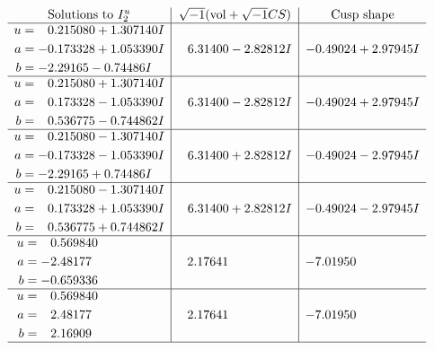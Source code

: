 \documentclass[1p]{elsarticle_modified}
\theoremstyle{definition}
\newcommand{\I}{\sqrt{-1}}
\begin{document}
$$\begin{array}{c|c|c}  
\text{Solutions to }I^u_{2}& \I (\text{vol} + \sqrt{-1}CS) & \text{Cusp shape}\\
 \hline 
\begin{aligned}
u &= \phantom{-}0.215080 + 1.307140 I \\
a &= -0.173328 + 1.053390 I \\
b &= -2.29165 - 0.74486 I\end{aligned}
 & \phantom{-}6.31400 - 2.82812 I & -0.49024 + 2.97945 I \\ \hline\begin{aligned}
u &= \phantom{-}0.215080 + 1.307140 I \\
a &= \phantom{-}0.173328 - 1.053390 I \\
b &= \phantom{-}0.536775 - 0.744862 I\end{aligned}
 & \phantom{-}6.31400 - 2.82812 I & -0.49024 + 2.97945 I \\ \hline\begin{aligned}
u &= \phantom{-}0.215080 - 1.307140 I \\
a &= -0.173328 - 1.053390 I \\
b &= -2.29165 + 0.74486 I\end{aligned}
 & \phantom{-}6.31400 + 2.82812 I & -0.49024 - 2.97945 I \\ \hline\begin{aligned}
u &= \phantom{-}0.215080 - 1.307140 I \\
a &= \phantom{-}0.173328 + 1.053390 I \\
b &= \phantom{-}0.536775 + 0.744862 I\end{aligned}
 & \phantom{-}6.31400 + 2.82812 I & -0.49024 - 2.97945 I \\ \hline\begin{aligned}
u &= \phantom{-}0.569840\phantom{ +0.000000I} \\
a &= -2.48177\phantom{ +0.000000I} \\
b &= -0.659336\phantom{ +0.000000I}\end{aligned}
 & \phantom{-}2.17641\phantom{ +0.000000I} & -7.01950\phantom{ +0.000000I} \\ \hline\begin{aligned}
u &= \phantom{-}0.569840\phantom{ +0.000000I} \\
a &= \phantom{-}2.48177\phantom{ +0.000000I} \\
b &= \phantom{-}2.16909\phantom{ +0.000000I}\end{aligned}
 & \phantom{-}2.17641\phantom{ +0.000000I} & -7.01950\phantom{ +0.000000I}\\
 \hline 
 \end{array}$$\newpage\newpage\renewcommand{\arraystretch}{1}
\end{document}
